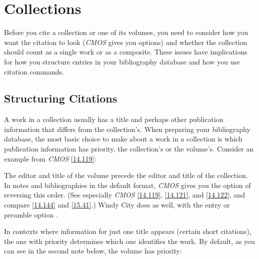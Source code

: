 \documentclass[11pt,letterpaper,oneside]{article}
\begin{document}
\section{Collections}
\label{collections}

Before you cite a collection or one of its volumes, you need to
consider how you want the citation to look (\textit{CMOS} gives you
options) and whether the collection should count as a single work or
as a composite. These issues have implications for how you structure
entries in your bibliography database and how you use citation
commands.

\subsection{Structuring Citations}
\label{collorder}

A work in a collection usually has a title and perhaps other
publication information that differs from the collection's. When
preparing your bibliography database, the most basic choice to make
about a work in a collection is which publication information has
priority, the collection's or the volume's. Consider an example from
\textit{CMOS} \ref{14.119}:

\begin{citebib}
\item \cite{armstrong2014}
\end{citebib}

\noindent The editor and title of the volume precede the editor and
title of the collection. In notes and bibliographies in the default
format, \textit{CMOS} gives you the option of reversing this order.
(See especially \textit{CMOS} \ref{14.119}, \ref{14.121}, and
\ref{14.122}, and compare \ref{14.144} and \ref{15.41}.) Windy City
does as well, with the entry or preamble option .

\begin{citebib}
\item \cite{armstrong2014}
\end{citebib}

In contexts where information for just one title appears (certain
short citations), the one with priority determines which one
identifies the work. By default, as you can see in the second note
below, the volume has priority:

\begin{citeonly}
\item \cite{armstrong2014}
\item \cite[45]{armstrong2014}
\end{citeonly}
\end{document}
